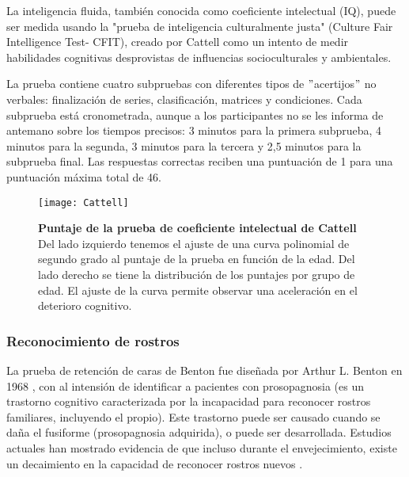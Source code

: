\documentclass[11pt,letterpaper]{article}
\numberwithin{equation}{subsection}
\numberwithin{table}{subsection}
\begin{document}
\bigskip
\noindent La inteligencia fluida, también conocida como coeficiente intelectual (IQ), puede ser medida usando la "prueba de inteligencia culturalmente justa" (Culture Fair Intelligence Test- CFIT), creado por Cattell como un intento de medir habilidades cognitivas desprovistas de influencias socioculturales y ambientales. 

\bigskip
\noindent La prueba contiene cuatro subpruebas con diferentes tipos de $"$acertijos$"$ no verbales: finalización de series, clasificación, matrices y condiciones. Cada subprueba está cronometrada, aunque a los participantes no se les informa de antemano sobre los tiempos precisos: 3 minutos para la primera subprueba, 4 minutos para la segunda, 3 minutos para la tercera y 2,5 minutos para la subprueba final. Las respuestas correctas reciben una puntuación de 1 para una puntuación máxima total de 46.

\begin{figure}[H]
\centering
	\texttt{[image: Cattell]}
	\captionsetup{labelfont=bf}
	\caption{\scriptsize \textbf{Puntaje de la prueba de coeficiente intelectual de Cattell} Del lado izquierdo tenemos el ajuste de una curva polinomial de segundo grado al puntaje de la prueba en función de la edad. Del lado derecho se tiene la distribución de los puntajes por grupo de edad. El ajuste de la curva permite observar una aceleración en el deterioro cognitivo.}
	\label{fig:Cattell}
\end{figure}

\subsubsection{Reconocimiento de rostros}

\smallskip
\noindent La prueba de retención de caras de Benton fue diseñada por Arthur L. Benton en 1968 \cite{benton1968impairment}, con al intensión de identificar a pacientes con prosopagnosia (es un trastorno cognitivo caracterizada por la incapacidad para reconocer rostros familiares, incluyendo el propio). Este trastorno puede ser causado cuando se daña el fusiforme (prosopagnosia adquirida), o puede ser desarrollada. Estudios actuales han mostrado evidencia de que incluso durante el envejecimiento, existe un decaimiento en la capacidad de reconocer rostros nuevos \cite{bartlett1986aging}.
\end{document}
